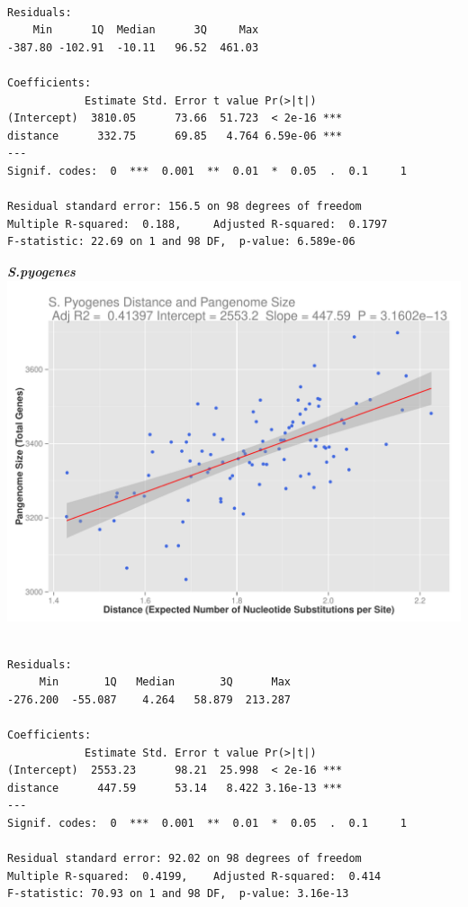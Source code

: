 \documentclass[12pt]{article}
\begin{document}
\begin{lstlisting}

Residuals:
    Min      1Q  Median      3Q     Max 
-387.80 -102.91  -10.11   96.52  461.03 

Coefficients:
            Estimate Std. Error t value Pr(>|t|)    
(Intercept)  3810.05      73.66  51.723  < 2e-16 ***
distance      332.75      69.85   4.764 6.59e-06 ***
---
Signif. codes:  0  ***  0.001  **  0.01  *  0.05  .  0.1     1

Residual standard error: 156.5 on 98 degrees of freedom
Multiple R-squared:  0.188,     Adjusted R-squared:  0.1797 
F-statistic: 22.69 on 1 and 98 DF,  p-value: 6.589e-06
\end{lstlisting}

\newpage

{\large \textbf{\textit{S.pyogenes}}\\}
\includegraphics[width=\textwidth]{spyogenesplot.pdf}

\begin{lstlisting}

Residuals:
     Min       1Q   Median       3Q      Max 
-276.200  -55.087    4.264   58.879  213.287 

Coefficients:
            Estimate Std. Error t value Pr(>|t|)    
(Intercept)  2553.23      98.21  25.998  < 2e-16 ***
distance      447.59      53.14   8.422 3.16e-13 ***
---
Signif. codes:  0  ***  0.001  **  0.01  *  0.05  .  0.1     1

Residual standard error: 92.02 on 98 degrees of freedom
Multiple R-squared:  0.4199,    Adjusted R-squared:  0.414 
F-statistic: 70.93 on 1 and 98 DF,  p-value: 3.16e-13


\end{lstlisting} 
\end{document}
